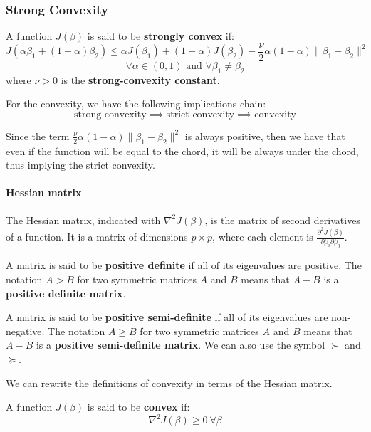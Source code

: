 \subsubsection*{Strong Convexity}
\begin{definition}
    A function $J(\beta)$ is said to  be \textbf{strongly convex} if:
    \[
        J(\alpha \beta_1 + (1-\alpha)\beta_2) \leq \alpha J(\beta_1) + (1-\alpha)J(\beta_2) - \frac{\nu}{2} \alpha (1-\alpha) \| \beta_1 - \beta_2 \|^2
    \]
    \[
        \forall \alpha \in (0,1) \text{ and } \forall \beta_1 \neq \beta_2
    \]
    where $\nu >0 $ is the \textbf{strong-convexity constant}.
\end{definition}

\begin{theorem}
    For the convexity, we have the following implications chain:
    \[
        \text{strong convexity} \implies \text{strict convexity} \implies \text{convexity}
    \]
\end{theorem}
Since the term $\frac{\nu}{2} \alpha (1-\alpha) \| \beta_1 - \beta_2 \|^2$ is always positive, then we have that even if the function will be equal to the chord, it will be always under the chord, thus implying the strict convexity.
\paragraph*{Hessian matrix}
The Hessian matrix, indicated with $\nabla^2 J(\beta)$, is the matrix of second derivatives of a function. It is a matrix of dimensions $p \times p$, where each element is $\frac{\partial^2 J(\beta)}{\partial \beta_i \partial \beta_j}$.

\begin{definition}
    A matrix is said to be \textbf{positive definite} if all of its eigenvalues are positive. The notation $A > B$ for two symmetric matrices $A$ and $B$ means that $A-B$ is a \textbf{positive definite matrix}.
\end{definition}

\begin{definition}
    A matrix is said to be \textbf{positive semi-definite} if all of its eigenvalues are non-negative. The notation $A \geq B$ for two symmetric matrices $A$ and $B$ means that $A-B$ is a \textbf{positive semi-definite matrix}. We can also use the symbol $\succ$ and $\succeq$.
\end{definition}

We can rewrite the definitions of convexity in terms of the Hessian matrix.
\begin{definition}
    A function $J(\beta)$ is said to be \textbf{convex} if:
    \[
        \nabla^2 J(\beta) \geq 0 \ \forall \beta
    \]
\end{definition}

